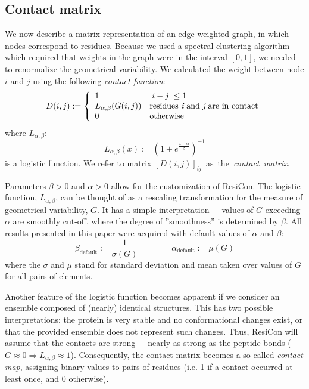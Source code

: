 \documentclass[a4paper,11pt,twoside]{book}%
\begin{document}
\subsection*{Contact matrix}
We now describe a matrix representation of an edge-weighted graph, in which nodes correspond to residues.
Because we used a spectral clustering algorithm which required that weights in the graph were in the interval $[0,1]$, we needed to renormalize the geometrical variability.
We calculated the weight between node $i$ and $j$ using the following \emph{contact function}:
\begin{displaymath}
D(i,j) := \left\{ \begin{array}{ll}
1&  |i-j| \leq 1 \\
L_{\alpha,\beta}(G(i,j))& \text{residues {\it i} and {\it j} are in contact} \\
0& \textrm{otherwise}
\end{array} \right .
\end{displaymath}
where $L_{\alpha,\beta}$:
$$
L_{\alpha,\beta}(x):= \left ( 1 + e^{\frac{x-\alpha}{\beta} } \right )^{-1}
$$
is a logistic function.
We refer to matrix $[D(i,j)]_{ij}$~as~the~\emph{contact~matrix}.

Parameters $\beta>0$ and $\alpha>0$ allow for the customization of ResiCon.
The logistic function, $L_{\alpha,\beta}$, can be thought of as a rescaling transformation for the measure of geometrical variability, $G$.
It has a simple interpretation~--~values of $G$ exceeding $\alpha$ are smoothly cut-off, where the degree of ''smoothness'' is determined by $\beta$.
All results presented in this paper were acquired with default values of $\alpha$ and $\beta$:
\begin{equation}
\beta_{\text{default}} := \frac{1}{\sigma(G)} \qquad\qquad  \alpha_{\text{default}} := \mu(G)
\label{default}
\end{equation}
where the $\sigma$ and $\mu$ stand for standard deviation and mean taken over values of $G$ for all pairs of elements.

Another feature of the logistic function becomes apparent if we consider an ensemble composed of (nearly) identical structures.
This has two possible interpretations: the protein is very stable and no conformational changes exist, or that the provided ensemble does not represent such changes.
Thus, ResiCon will assume that the contacts are strong~--~nearly as strong as the peptide bonds ($G\approx 0 \Rightarrow L_{\alpha,\beta}\approx 1$).
Consequently, the contact matrix becomes a so-called \emph{contact map}, assigning binary values to pairs of residues (i.e. 1 if a contact occurred at least once, and 0 otherwise).
\end{document}
